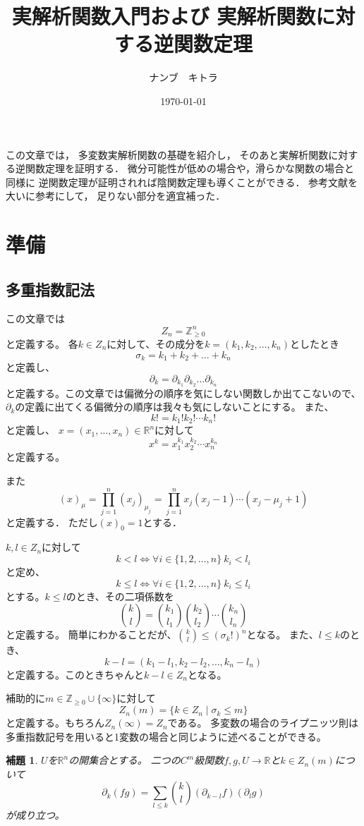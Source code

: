 \documentclass[leqno, a4paper, 12pt]{jsarticle}
\title{
実解析関数入門および
実解析関数に対する逆関数定理
}
\author{ナンブ　キトラ}
\date{\today}
\newtheorem{lem}[thm]{補題}
\newcommand{\zz}{\mathbb{Z}}
\newcommand{\rr}{\mathbb{R}}
\begin{document}
\maketitle

この文章では，
多変数実解析関数の基礎を紹介し，
そのあと実解析関数に対する逆関数定理を証明する．
微分可能性が低めの場合や，滑らかな関数の場合と同様に
逆関数定理が証明されれば陰関数定理も導くことができる．
参考文献\cite{0}を大いに参考にして，
足りない部分を適宜補った．
\section{準備}
\subsection{多重指数記法}
この文章では
\[
Z_n=\zz_{\ge 0}^n
\]
と定義する。
各$k\in Z_n$に対して、その成分を$k=(k_1,k_2,\dots,k_n)$としたとき
\[
\sigma_k=k_1+k_2+\dots+k_n
\]
と定義し、
\[
\partial_k=\partial_{k_1}\partial_{k_2}\dots\partial_{k_n}
\]
と定義する。この文章では偏微分の順序を気にしない関数しか出てこないので、$\partial_k$の定義に出てくる偏微分の順序は我々も気にしないことにする。
また、
\[
k!=k_1!k_2!\cdots k_n!
\]
と定義し、
$x=(x_1, \dots, x_n)\in \rr^n$に対して
\[
x^k=x_1^{k_1}x_2^{k_2}\cdots x_n^{k_n}
\]
と定義する。

また
\[
(x)_\mu=\prod_{j=1}^n(x_j)_{\mu_j}=
\prod_{j=1}^nx_j(x_j-1)\cdots (x_j-\mu_j+1)
\]
と定義する．
ただし$(x)_0=1$とする．

$k,l\in Z_n$に対して
\[
k<l\iff \forall i\in \{1, 2, \dots, n\}\ k_i<l_i
\]
と定め、
\[
k\le l\iff \forall i\in \{1, 2, \dots, n\}\ k_i\le l_i
\]
とする。$k\le l$のとき、その二項係数を
\[
\binom{k}{l}=\binom{k_1}{l_1}\binom{k_2}{l_2}\cdots\binom{k_n}{l_n}
\]
と定義する。
簡単にわかることだが、$\binom{k}{l}\le (\sigma_k!)^n$となる。
また、$l\le k$のとき、
\[
k-l=(k_1-l_1,k_2-l_2, \dots, k_n-l_n)
\]
と定義する。このときちゃんと$k-l\in Z_n$となる。

補助的に$m\in \zz_{\ge 0}\cup \{\infty\}$に対して
\[
Z_n(m)=\{k\in Z_n\mid \sigma_k\le m\}
\]
と定義する。もちろん$Z_n(\infty)=Z_n$である。
多変数の場合のライプニッツ則は多重指数記号を用いると1変数の場合と同じように述べることができる。
\begin{lem}
$U$を$\rr^n$の開集合とする。
二つの$C^m$級関数$f,g,U\to \rr$と$k\in Z_n(m)$について
\[
\partial_k(fg)=\sum_{l\le k}\binom{k}{l}(\partial_{k-l}f)(\partial_lg)
\]
が成り立つ。
\end{lem}
\end{document}
